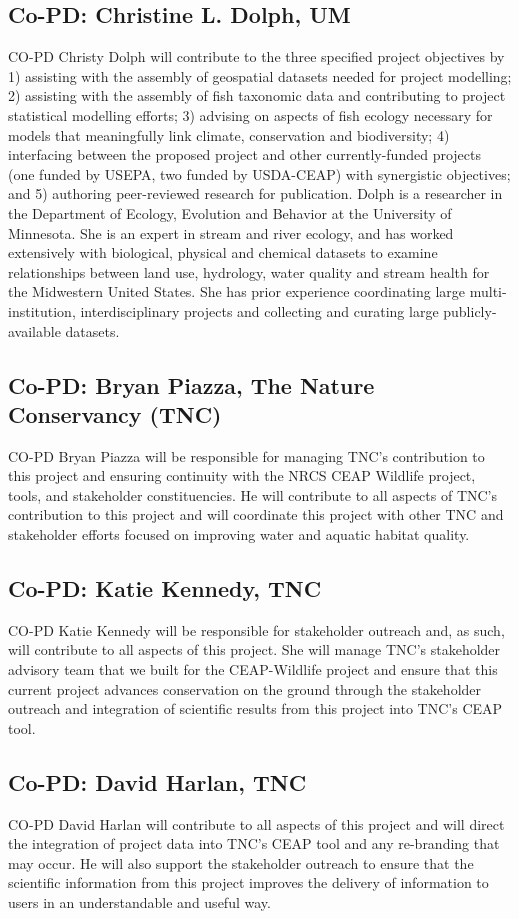 \documentclass[12pt, class=article, crop=false]{standalone}
\begin{document}
\subsection*{Co-PD: Christine L. Dolph, UM}
CO-PD Christy Dolph will contribute to the three specified project objectives by 1) assisting with the assembly of geospatial datasets needed for project modelling; 2) assisting with the assembly of fish taxonomic data and contributing to project statistical modelling efforts; 3) advising on aspects of fish ecology necessary for models that meaningfully link climate, conservation and biodiversity; 4) interfacing between the proposed project and other currently-funded projects (one funded by USEPA, two funded by USDA-CEAP) with synergistic objectives; and 5) authoring peer-reviewed research for publication.
Dolph is a researcher in the Department of Ecology, Evolution and Behavior at the University of Minnesota. She is an expert in stream and river ecology, and has worked extensively with biological, physical and chemical datasets to examine relationships between land use, hydrology, water quality and stream health for the Midwestern United States.
She has prior experience coordinating large multi-institution, interdisciplinary projects and collecting and curating large publicly-available datasets.

\subsection*{Co-PD: Bryan Piazza, The Nature Conservancy (TNC)}
CO-PD Bryan Piazza will be responsible for managing TNC's contribution to this project and ensuring continuity with the NRCS CEAP Wildlife project, tools, and stakeholder constituencies.
He will contribute to all aspects of TNC’s contribution to this project and will coordinate this project with other TNC and stakeholder efforts focused on improving water and aquatic habitat quality.

\subsection*{Co-PD: Katie Kennedy, TNC}
CO-PD Katie Kennedy will be responsible for stakeholder outreach and, as such, will contribute to all aspects of this project.
She will manage TNC’s stakeholder advisory team that we built for the CEAP-Wildlife project and ensure that this current project advances conservation on the ground through the stakeholder outreach and integration of scientific results from this project into TNC’s CEAP tool. 

\subsection*{Co-PD: David Harlan, TNC}
CO-PD David Harlan will contribute to all aspects of this project and will direct the integration of project data into TNC’s CEAP tool and any re-branding that may occur. He will also support the stakeholder outreach to ensure that the scientific information from this project improves the delivery of information to users in an understandable and useful way. 
\end{document}
